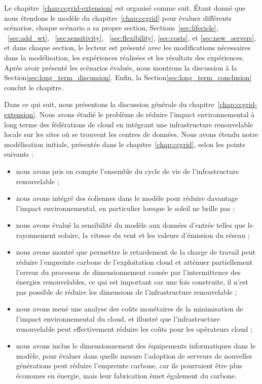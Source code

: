 Le chapitre~\ref{chap:ccgrid-extension} est organisé comme suit. Étant donné que nous étendons le modèle du chapitre~\ref{chap:ccgrid} pour évaluer différents scénarios, chaque scénario a sa propre section, Sections~\ref{sec:lifecicle}, ~\ref{sec:add_wt}, ~\ref{sec:sensitivity}, ~\ref{sec:flexibility}, \ref{sec:costs}, et \ref{sec:new_servers}, et dans chaque section, le lecteur est présenté avec les modifications nécessaires dans la modélisation, les expériences réalisées et les résultats des expériences. Après avoir présenté les scénarios évalués, nous montrons la discussion à la Section\ref{sec:long_term_discussion}. Enfin, la Section\ref{sec:long_term_conclusion} conclut le chapitre.

Dans ce qui suit, nous présentons la discussion générale du chapitre~\ref{chap:ccgrid-extension}. Nous avons étudié le problème de réduire l'impact environnemental à long terme des fédérations de cloud en intégrant une infrastructure renouvelable locale sur les sites où se trouvent les centres de données. Nous avons étendu notre modélisation initiale, présentée dans le chapitre~\ref{chap:ccgrid}, selon les points suivants :

\begin{itemize}
    \item nous avons pris en compte l'ensemble du cycle de vie de l'infrastructure renouvelable ;
    \item nous avons intégré des éoliennes dans le modèle pour réduire davantage l'impact environnemental, en particulier lorsque le soleil ne brille pas ;
    \item nous avons évalué la sensibilité du modèle aux données d'entrée telles que le rayonnement solaire, la vitesse du vent et les valeurs d'émission du réseau ;
    \item nous avons montré que permettre le retardement de la charge de travail peut réduire l'empreinte carbone de l'exploitation cloud et atténuer partiellement l'erreur du processus de dimensionnement causée par l'intermittence des énergies renouvelables, ce qui est important car une fois construite, il n'est pas possible de réduire les dimensions de l'infrastructure renouvelable ;
    \item nous avons mené une analyse des coûts monétaires de la minimisation de l'impact environnemental du cloud, et illustré que l'infrastructure renouvelable peut effectivement réduire les coûts pour les opérateurs cloud ;
    \item nous avons inclus le dimensionnement des équipements informatiques dans le modèle, pour évaluer dans quelle mesure l'adoption de serveurs de nouvelles générations peut réduire l'empreinte carbone, car ils pourraient être plus économes en énergie, mais leur fabrication émet également du carbone.
\end{itemize}

